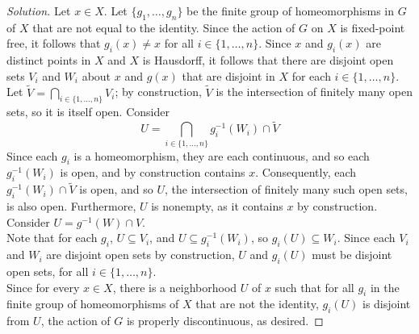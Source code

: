 \documentclass[11pt]{article}
\newenvironment{solution}
  {\renewcommand\qedsymbol{$\blacksquare$}\begin{proof}[Solution]}
  {\end{proof}}
\begin{document}
\begin{solution}
Let $x \in X$. Let $\{ g_1, \dots, g_n \} $ be the finite group of homeomorphisms in $G$ of $X$ that are not equal to the identity. 
Since the action of $G$ on $X$ is fixed-point free, it follows that $g_i(x) \neq x$ for all $i \in \{ 1, \dots, n \}$. 
Since $x$ and $g_i(x)$ are distinct points in $X$ and $X$ is Hausdorff, it follows that there are disjoint open sets $V_i$ and $W_i$ about $x$ and $g(x)$ that are disjoint in $X$ for each $i \in \{ 1, \dots, n \}$. \\

Let $\tilde{V} = \bigcap\limits_{i \in \{ 1, \dots, n \} } V_i$; by construction, $\tilde{V}$ is the intersection of finitely many open sets, so it is itself open. 
Consider
\[
    U = \bigcap_{i \in \{ 1, \dots, n \} } g_i^{-1}(W_i) \cap \tilde{V}
\]
Since each $g_i$ is a homeomorphism, they are each continuous, and so each $g_i^{-1}(W_i)$ is open, and by construction contains $x$. Consequently, each $g_i^{-1}(W_i) \cap \tilde{V}$ is open, and so $U$, the intersection of
finitely many such open sets, is also open. Furthermore, $U$ is nonempty, as it contains $x$ by construction. Consider $U = g^{-1}(W) \cap V$.\\

Note that for each $g_i$, $U \subseteq V_i$, and $U \subseteq g_i^{-1}(W_i)$, so $g_i(U) \subseteq W_i$. Since each $V_i$ and $W_i$ are disjoint open sets by construction,
$U$ and $g_i(U)$ must be disjoint open sets, for all $i \in \{ 1, \dots, n \}$. \\

Since for every $x \in X$, there is a neighborhood $U$ of $x$ such that for all $g_i$ in the finite group of homeomorphisms of $X$ that are not the identity, $g_i(U)$ is disjoint from $U$,
the action of $G$ is properly discontinuous, as desired.
\end{solution}
\end{document}
